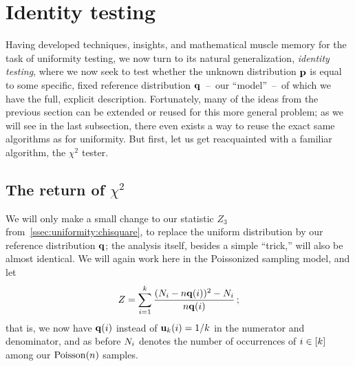 \section{Identity testing}
  \label{sec:identity}
Having developed techniques, insights, and mathematical muscle memory for the task of uniformity testing, we now turn to its natural generalization, \emph{identity testing}, where we now seek to test whether the unknown distribution $\mathbf{p}$ is equal to some specific, fixed reference distribution $\mathbf{q}$~--~our ``model''~--~of which we have the full, explicit description. Fortunately, many of the ideas from the previous section can be extended or reused for this more general problem; as we will see in the last subsection, there even exists a way to reuse the exact same algorithms as for uniformity. But first, let us get reacquainted  with a familiar algorithm, the $\chi^2$ tester.

\subsection{The return of $\chi^2$}
	\label{ssec:chisquare:identity}

We will only make a small change to our statistic $Z_3$ from~\cref{ssec:uniformity:chisquare}, to replace the uniform distribution by our reference distribution $\mathbf{q}$; the analysis itself, besides a simple ``trick,'' will also be almost identical. We will again work here in the Poissonized sampling model, and let
\begin{equation}
  \label{eq:def:z:chisquare:identity}
    Z = \sum_{i=1}^k \frac{(N_i-n\mathbf{q}(i))^2- N_i}{n\mathbf{q}(i)}\,;
\end{equation}
that is, we now have $\mathbf{q}(i)$ instead of $\mathbf{u}_k(i)=1/k$ in the numerator and denominator, and as before $N_i$ denotes the number of occurrences of $i\in[k]$ among our $\poisson{\ns}$ samples. 

